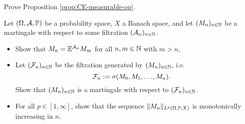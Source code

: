 \begin{exercise}\label{ex:CE-measurable-op}
  Prove Proposition \ref{prop:CE-measurable-op}.
\end{exercise}

\begin{exercise}\label{ex:martingale-elementary-properties}
  Let $(\Omega,\mc{A},\P)$ be a probability space, $X$ a Banach space, and let $(M_n)_{n \in \N}$ be a martingale with respect to some filtration $(\mc{A}_n)_{n \in \N}$.
  \begin{itemize}
  \item
    Show that $M_n = \E^{\mc{A}_n} M_m$ for all $n,m \in \N$ with $m > n$,
  \item
    Let $(\mc{F}_n)_{n \in \N}$ be the filtration generated by $(M_n)_{n \in \N}$, i.e.
    \begin{equation*}
      \mc{F}_n := \sigma(M_0, M_1, \ldots, M_n).
    \end{equation*}
    Show that $(M_n)_{n \in \N}$ is a martingale with respect to $(\mc{F}_n)_{n \in \N}$.
  \item
    For all $p \in [1,\infty]$, show that the sequence $\|M_n\|_{L^p(\Omega,\P;X)}$ is monotonically increasing in $n$.
  \end{itemize}

\end{exercise}



